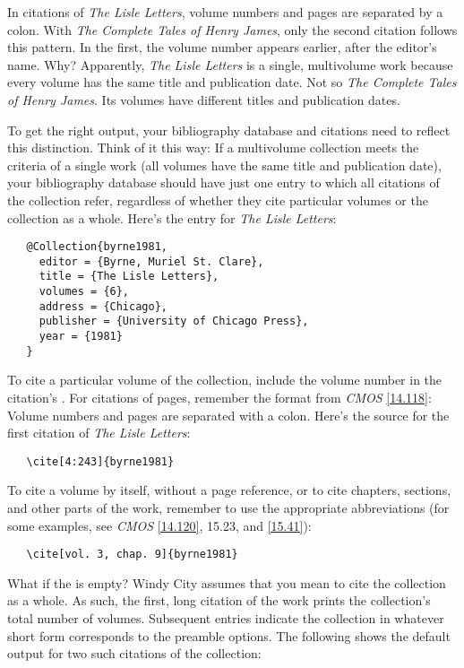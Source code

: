 \documentclass[11pt,letterpaper,oneside]{article}
\begin{document}
In citations of \textit{The Lisle Letters}, volume numbers and pages
are separated by a colon. With \textit{The Complete Tales of Henry
James}, only the second citation follows this pattern. In the first,
the volume number appears earlier, after the editor's name. Why?
Apparently, \textit{The Lisle Letters} is a single, multivolume work
because every volume has the same title and publication date. Not so
\textit{The Complete Tales of Henry James}. Its volumes have different
titles and publication dates.

To get the right output, your bibliography database and citations need
to reflect this distinction. Think of it this way: If a multivolume
collection meets the criteria of a single work (all volumes have the
same title and publication date), your bibliography database should
have just one entry to which all citations of the collection refer,
regardless of whether they cite particular volumes or the collection
as a whole. Here's the entry for \textit{The Lisle Letters}:

\begin{verbatim}
   @Collection{byrne1981,
     editor = {Byrne, Muriel St. Clare},
     title = {The Lisle Letters},
     volumes = {6},
     address = {Chicago},
     publisher = {University of Chicago Press},
     year = {1981}
   }
\end{verbatim}

To cite a particular volume of the collection, include the volume
number in the citation's . For citations of pages,
remember the format from \textit{CMOS} \ref{14.118}: Volume numbers
and pages are separated with a colon. Here's the source for the first
citation of \textit{The Lisle Letters}:

\begin{verbatim}
   \cite[4:243]{byrne1981}
\end{verbatim}

\noindent To cite a volume by itself, without a page reference, or to
cite chapters, sections, and other parts of the work, remember to use
the appropriate abbreviations (for some examples, see \textit{CMOS}
\ref{14.120}, 15.23, and \ref{15.41}):

\begin{verbatim}
   \cite[vol. 3, chap. 9]{byrne1981}
\end{verbatim}

What if the  is empty? Windy City assumes that you
mean to cite the collection as a whole. As such, the first, long
citation of the work prints the collection's total number of volumes.
Subsequent entries indicate the collection in whatever short form
corresponds to the preamble options. The following shows the default
output for two such citations of the collection:
\end{document}
